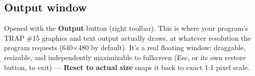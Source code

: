\subsection*{Output window}
Opened with the \textbf{Output} button (right toolbar). This is where your program's TRAP \#15 graphics and text output actually draws, at whatever resolution the program requests (640×480 by default). It's a real floating window: draggable, resizable, and independently maximizable to fullscreen (Esc, or its own restore button, to exit) — \textbf{Reset to actual size} snaps it back to exact 1:1 pixel scale.
